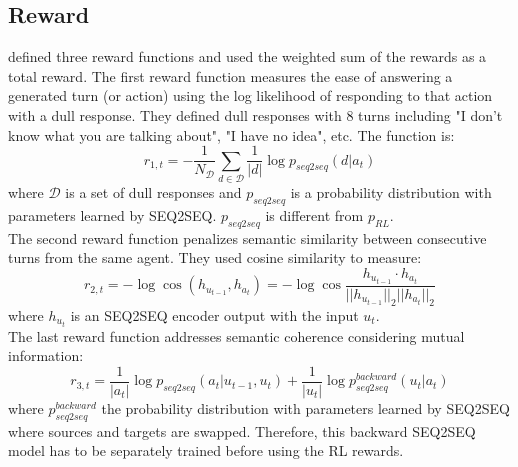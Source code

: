 \subsection{Reward}
\cite{Li} defined three reward functions and used the weighted sum of the rewards as a total reward. The first reward function measures the ease of answering a generated turn (or action) using the log likelihood of responding to that action with a dull response. They defined dull responses with 8 turns including "I don't know what you are talking about", "I have no idea", etc. The function is:
\begin{equation}
	r_{1,t} = -\frac{1}{N_{\mathcal{D}}} \sum_{d\in \mathcal{D}} \frac{1}{|d|} \log p_{seq2seq}(d|a_t)
\end{equation} 
where $\mathcal{D}$ is a set of dull responses and $p_{seq2seq}$ is a probability distribution with parameters learned by SEQ2SEQ. $p_{seq2seq}$ is different from $p_{RL}$. \\
The second reward function penalizes semantic similarity between consecutive turns from the same agent. They used cosine similarity to measure:
\begin{equation}
	r_{2,t} = -\log \cos (h_{u_{t-1}}, h_{a_t}) = -\log \cos \frac{h_{u_{t-1}}\cdot h_{a_t}}{||h_{u_{t-1}}||_2 ||h_{a_t}||_2} \label{eq:reward2}
\end{equation}
where $h_{u_{t}}$ is an SEQ2SEQ encoder output with the input $u_t$. \\
The last reward function addresses semantic coherence considering mutual information:
\begin{equation}
r_{3,t} = \frac{1}{|a_t|} \log p_{seq2seq} (a_t|u_{t-1},u_t) + \frac{1}{|u_t|} \log p_{seq2seq}^{backward}(u_t|a_t) \label{eq:reward3}
\end{equation}
where $ p_{seq2seq}^{backward}$ the probability distribution with parameters learned by SEQ2SEQ where sources and targets are swapped. Therefore, this backward SEQ2SEQ model has to be separately trained before using the RL rewards. 

